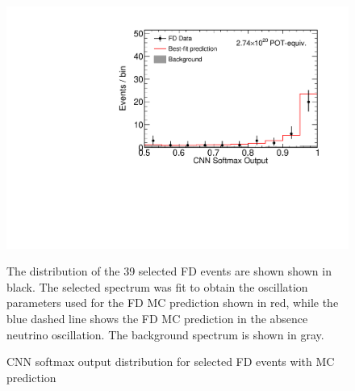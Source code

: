 \begin{figure}
\begin{center}
\includegraphics[width=\textwidth]{figures/results/fd_data_mc_numi_plots/cvn_unblind.pdf}
\end{center}
\caption{ CNN softmax output distribution for selected FD events with MC prediction }{
The distribution of the 39 selected FD events are shown shown in black.
The selected spectrum was fit to obtain the oscillation parameters used
for the FD MC prediction shown in red, while
the blue dashed line shows the FD MC prediction in the absence neutrino
oscillation.
The background spectrum is shown in gray.
}
\label{cvn_unblind}

\end{figure}



